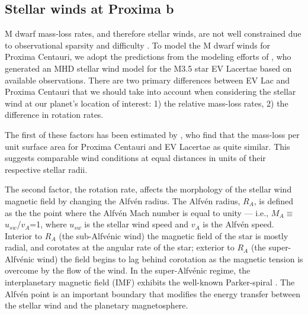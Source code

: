 \documentclass{emulateapj}
\begin{document}
\subsection{Stellar winds at Proxima b}
\label{sec:stellar_winds}

M dwarf mass-loss rates, and therefore stellar winds, are not well constrained due to observational sparsity and difficulty \citep[e.g.][]{Wood2004}. To model the M dwarf winds for Proxima Centauri, we adopt the predictions from the modeling efforts of \citet{Cohen2014}, who generated an MHD stellar wind model for the M3.5 star EV Lacertae based on available observations. There are two primary differences between EV Lac and Proxima Centauri that we should take into account when considering the stellar wind at our planet's location of interest: 1) the relative mass-loss rates, 2) the difference in rotation rates. 

The first of these factors has been estimated by \citet{Wood2005}, who find that the mass-loss per unit surface area for Proxima Centauri and EV Lacertae as quite similar.   This suggests comparable wind conditions at equal distances in units of their respective stellar radii. 

The second factor, the rotation rate, affects the morphology of the stellar wind magnetic field by changing the Alfv\'{e}n radius.  The Alfv\'{e}n radius, $R_A$, is defined as the the point where the Alfv\'{e}n Mach number is equal to unity --- i.e., $M_A \equiv$ $u_{sw}$/$v_{A}$=1, where $u_{sw}$ is the stellar wind speed and $v_A$ is the Alfv\'{e}n speed. Interior to $R_A$ (the sub-Alfv\'{e}nic wind) the magnetic field of the star is mostly radial, and corotates at the angular rate of the star; exterior to $R_A$ (the super-Alfv\'{e}nic wind) the field begins to lag behind corotation as the magnetic tension is overcome by the flow of the wind. In the super-Alfv\'{e}nic regime, the interplanetary magnetic field (IMF) exhibits the well-known Parker-spiral \citep{Parker1958}. The Alfv\'{e}n point is an important boundary that modifies the energy transfer between the stellar wind and the planetary magnetosphere.
\end{document}
